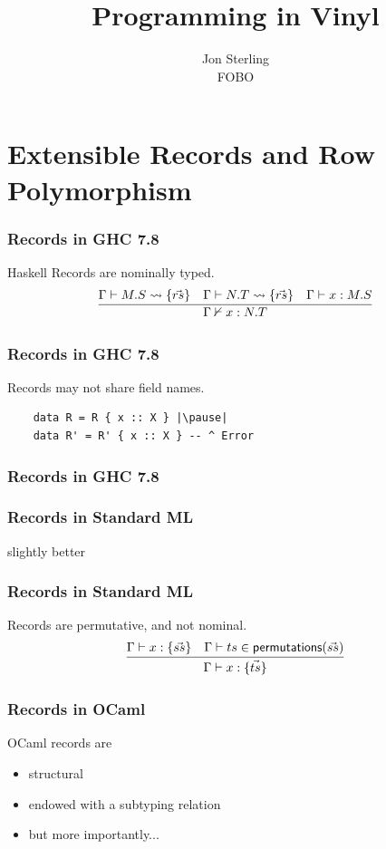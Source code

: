 \documentclass[12pt]{beamer}
\title{Programming in Vinyl}
\author{Jon Sterling\\
    FOBO
}
\begin{document}
\begin{frame}
\titlepage
\end{frame}

\section{Extensible Records and Row Polymorphism}

\begin{frame}
  \frametitle{Records in GHC 7.8}
  Haskell Records are nominally typed. \pause
  \[
    \infer{
      \Gamma\nvdash x : N.T
    }{
      \Gamma\vdash M.S \leadsto \{ \vec{rs} \} &
      \Gamma\vdash N.T \leadsto \{ \vec{rs} \} &
      \Gamma\vdash x : M.S
    }
  \]
\end{frame}

\begin{frame}[fragile]
  \frametitle{Records in GHC 7.8}
  Records may not share field names. \pause

  \begin{lstlisting}
    data R = R { x :: X } |\pause|
    data R' = R' { x :: X } -- ^ Error
  \end{lstlisting}
\end{frame}

\begin{frame}
  \frametitle{Records in GHC 7.8}
\end{frame}

\begin{frame}
  \frametitle{Records in Standard ML}
  \pause
  \Large\centerline{slightly better}
\end{frame}

\begin{frame}[fragile]
  \frametitle{Records in Standard ML}
  \pause
  Records are permutative, and not nominal.\pause
  \[
    \infer{\Gamma\vdash x:\{\vec{ts}\}}{
      \Gamma\vdash x:\{\vec{ss}\} &
      \Gamma\vdash ts\in\mathsf{permutations}(\vec{ss})
    }
  \]
\end{frame}

\begin{frame}
  \frametitle{Records in OCaml}
   {
  OCaml records are\pause
  \begin{itemize}
    \item structural\pause
    \item endowed with a subtyping relation\pause
    \item but more importantly...
  \end{itemize}
  }
\end{frame}
\end{document}

